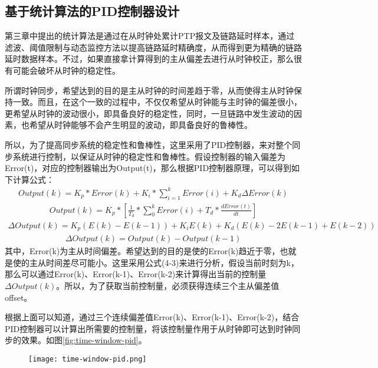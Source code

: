 \subsection{基于统计算法的PID控制器设计}
第三章中提出的统计算法是通过在从时钟处累计PTP报文及链路延时样本，通过滤波、阈值限制与动态监控方法以提高链路延时精确度，从而得到更为精确的链路延时数据样本。不过，如果直接拿计算得到的主从偏差去进行从时钟校正，那么很有可能会破坏从时钟的稳定性。

所谓时钟同步，希望达到的目的是主从时钟的时间差趋于零，从而使得主从时钟保持一致。而且，在这个一致的过程中，不仅仅希望从时钟能与主时钟的偏差很小，更希望从时钟的波动很小，即具备良好的稳定性，同时，一旦链路中发生波动的因素，也希望从时钟能够不会产生明显的波动，即具备良好的鲁棒性。

所以，为了提高同步系统的稳定性和鲁棒性，这里采用了PID控制器，来对整个同步系统进行控制，以保证从时钟的稳定性和鲁棒性。假设控制器的输入偏差为Error(t)，对应的控制器输出为Output(t)，那么根据PID控制器原理，可以得到如下计算公式：
\begin {align}
Output(k) = K_{p} * Error(k) + K_{i} * \sum_{i=1}^{k}Error(i) + K_{d}\Delta Error(k)
\end{align}
\begin {align}
Output(k) = K_{p} * [\frac{1}{T_{d}} * \sum_{0}^{k}Error(i) + T_{d} * \frac{dError(t)}{dt}]
\end{align}
\begin {align}
\Delta Output(k) = K_{p}(E(k) - E(k-1)) + K_{i}E(k) + K_{d}(E(k) - 2E(k-1) + E(k-2))
\end{align}
\begin {align}
\Delta Output(k) = Output(k) - Output(k-1)
\end{align}
其中，Error(k)为主从时间偏差。希望达到的目的是使的Error(k)趋近于零，也就是使的主从时间差尽可能小。这里采用公式(4-3)来进行分析，假设当前时刻为k，那么可以通过Error(k)、Error(k-1)、Error(k-2)来计算得出当前的控制量$\Delta Output(k)$。所以，为了获取当前控制量，必须获得连续三个主从偏差值offset。

根据上面可以知道，通过三个连续偏差值Error(k)、Error(k-1)、Error(k-2)，结合PID控制器可以计算出所需要的控制量，将该控制量作用于从时钟即可达到时钟同步的效果。如图\ref{fig:time-window-pid}。
\begin{figure}[htbp]
  \centering
  \begin{minipage}[b]{0.7\textwidth}
   \captionstyle{\centering}
   \centering
   \texttt{[image: time-window-pid.png]}
  \end{minipage}     
\end{figure}


